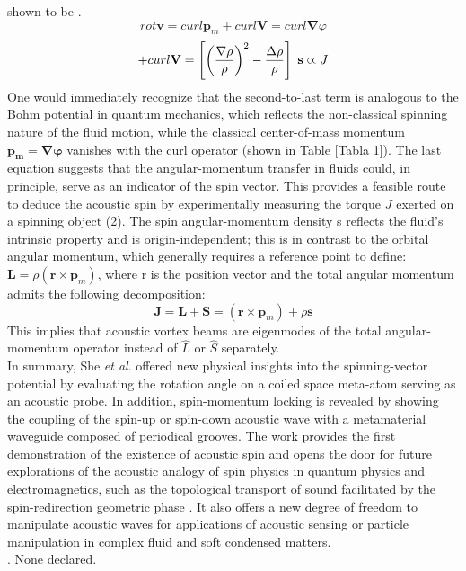 \documentclass[7pt]{article}
\begin{document}
\begin{multicols}{3}
shown to be \cite{4}.
   $$ rot\mathbf{v} = curl  \mathbf{p}_m + curl\mathbf{V} = curl\mathbf{\nabla}\varphi $$
\begin{equation}
    + curl\mathbf{ V} = \left[\left(\frac{\nabla \rho }{\rho}\right)^2 -\frac{\Delta \rho}{\rho}\right]\hspace{.10cm} \mathbf{s} \varpropto J
\end{equation}
One would immediately recognize that the second-to-last term is analogous to the Bohm potential in quantum mechanics, which reflects the non-classical spinning nature of the fluid motion, while the classical center-of-mass momentum $\mathbf{p_{m} = \nabla \varphi}$
vanishes with the curl operator (shown in Table \ref{Tabla 1}). The last equation suggests that the angular-momentum transfer in fluids could, in principle, serve as an indicator of the spin vector. This provides a feasible route to deduce the acoustic spin by experimentally measuring the torque $J$ exerted on a spinning object (2). 
The spin angular-momentum density s reflects the fluid's intrinsic property and is origin-independent; this is in contrast to the orbital angular momentum, which generally requires a reference point to define: $\mathbf{L}= \rho (\mathbf{r} \times \mathbf{p}_{m})$, 
 where r is the position vector and the total angular momentum admits the following decomposition:
\begin{equation}
    \mathbf{J = L + S } =(\mathbf{r} \times \mathbf{p}_{m}) +\rho \mathbf{s}
\end{equation}
This implies that acoustic vortex beams are eigenmodes of the total angular-momentum operator instead of $\hat{L}$ or $\hat{S}$ separately.\\
In summary, She {\it{et al}}. offered new physical insights into the spinning-vector potential by evaluating the rotation angle on a coiled space meta-atom serving as an acoustic probe\cite{2}. In addition, spin-momentum locking is revealed by showing the coupling of the spin-up or spin-down acoustic wave with a metamaterial waveguide composed of periodical grooves. The work provides the first demonstration of the existence of acoustic spin and opens the door for future explorations of the acoustic analogy of spin physics in quantum physics and electromagnetics, such as the topological transport of sound facilitated by the spin-redirection geometric phase \cite{5}. It also offers a new degree of freedom to manipulate acoustic waves for applications of acoustic sensing or particle manipulation in complex fluid and soft condensed matters.\\
\textcolor{gray}{}. None declared.\\
\printbibliography
\end{multicols}
\end{document}
